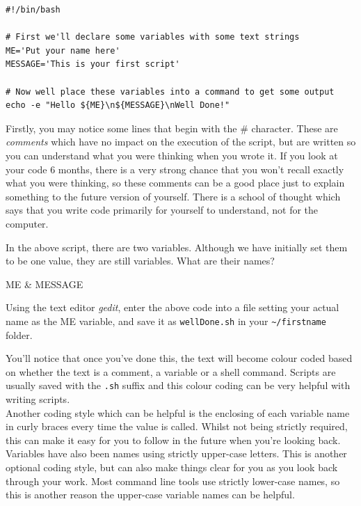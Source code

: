 \documentclass[a4paper,12pt,twoside]{memoir}
\begin{document}
\begin{lstlisting}
#!/bin/bash

# First we'll declare some variables with some text strings
ME='Put your name here'
MESSAGE='This is your first script'

# Now well place these variables into a command to get some output
echo -e "Hello ${ME}\n${MESSAGE}\nWell Done!"
\end{lstlisting}

\begin{information}
Firstly, you may notice some lines that begin with the \# character.
These are \textit{comments} which have no impact on the execution of the script, but are written so you can understand what you were thinking when you wrote it.
If you look at your code 6 months, there is a very strong chance that you won't recall exactly what you were thinking, so these comments can be a good place just to explain something to the future version of yourself.
There is a school of thought which says that you write code primarily for yourself to understand, not for the computer.
\end{information}

\begin{questions}
In the above script, there are two variables. 
Although we have initially set them to be one value, they are still variables.
What are their names? 
\begin{answer}
ME \& MESSAGE
\end{answer}
\end{questions}

\begin{steps}
Using the text editor \textit{gedit}, enter the above code into a file setting your actual name as the ME variable,  and save it as \texttt{wellDone.sh} in your \texttt{\~{}/firstname} folder.\\
\end{steps}

\begin{information}
You'll notice that once you've done this, the text will become colour coded based on whether the text is a comment, a variable or a shell command.
Scripts are usually saved with the \texttt{.sh} suffix and this colour coding can be very helpful with writing scripts.\\

Another coding style which can be helpful is the enclosing of each variable name in curly braces every time the value is called.
Whilst not being strictly required, this can make it easy for you to follow in the future when you're looking back.
Variables have also been names using strictly upper-case letters.
This is another optional coding style, but can also make things clear for you as you look back through your work.
Most command line tools use strictly lower-case names, so this is another reason the upper-case variable names can be helpful.
\end{information}
\end{document}
